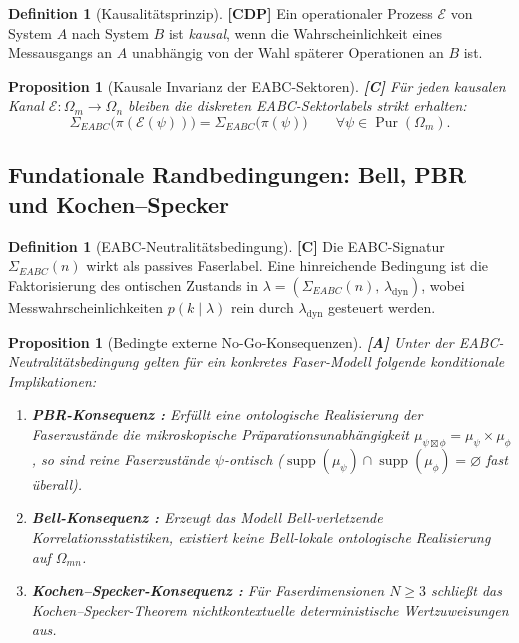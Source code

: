 \documentclass[11pt,a4paper,reqno]{amsart}
\newtheorem{proposition}[theorem]{Proposition}
\theoremstyle{definition}
\newtheorem{definition}[theorem]{Definition}
\theoremstyle{remark}
\newcommand{\Pur}{\operatorname{Pur}}
\begin{document}
	\begin{definition}[Kausalit\"atsprinzip] \cite{Chiribella2011} \textbf{[CDP]}
		Ein operationaler Prozess $\mathcal{E}$ von System $A$ nach System $B$ ist \emph{kausal}, wenn die Wahrscheinlichkeit eines Messausgangs an $A$ unabh\"angig von der Wahl sp\"aterer Operationen an $B$ ist.
	\end{definition}
	
	\begin{proposition}[Kausale Invarianz der EABC-Sektoren] \textbf{[C]}
		F\"ur jeden kausalen Kanal $\mathcal{E}: \Omega_m \to \Omega_n$ bleiben die diskreten EABC-Sektorlabels strikt erhalten:
		\begin{equation}
			\boxed{ \Sigma_{EABC}\bigl(\pi(\mathcal{E}(\psi))\bigr) = \Sigma_{EABC}\bigl(\pi(\psi)\bigr) \qquad \forall \psi \in \Pur(\Omega_m). }
		\end{equation}
	\end{proposition}
	
	\subsection{Fundationale Randbedingungen: Bell, PBR und Kochen--Specker}
	
	\begin{definition}[EABC-Neutralit\"atsbedingung] \textbf{[C]}
		Die EABC-Signatur $\Sigma_{EABC}(n)$ wirkt als passives Faserlabel. Eine hinreichende Bedingung ist die Faktorisierung des ontischen Zustands in $\lambda = (\Sigma_{EABC}(n), \, \lambda_{\mathrm{dyn}})$, wobei Messwahrscheinlichkeiten $p(k \mid \lambda)$ rein durch $\lambda_{\mathrm{dyn}}$ gesteuert werden.
	\end{definition}
	
	\begin{proposition}[Bedingte externe No-Go-Konsequenzen] \cite{Bell1964, PBR2012, KochenSpecker1967} \textbf{[A]}
		Unter der EABC-Neutralit\"atsbedingung gelten f\"ur ein konkretes Faser-Modell folgende konditionale Implikationen:
		\begin{enumerate}
			\item \textbf{PBR-Konsequenz \cite{PBR2012}:} Erf\"ullt eine ontologische Realisierung der Faserzust\"ande die mikroskopische Pr\"aparationsunabh\"angigkeit $\mu_{\psi \boxtimes \phi} = \mu_\psi \times \mu_\phi$, so sind reine Faserzust\"ande $\psi$-ontisch ($\operatorname{supp}(\mu_\psi) \cap \operatorname{supp}(\mu_\phi) = \varnothing$ fast \"uberall).
			\item \textbf{Bell-Konsequenz \cite{Bell1964}:} Erzeugt das Modell Bell-verletzende Korrelationsstatistiken, existiert keine Bell-lokale ontologische Realisierung auf $\Omega_{mn}$.
			\item \textbf{Kochen--Specker-Konsequenz \cite{KochenSpecker1967}:} F\"ur Faserdimensionen $N \ge 3$ schlie\ss{}t das Kochen--Specker-Theorem nichtkontextuelle deterministische Wertzuweisungen aus.
		\end{enumerate}
	\end{proposition}
	
\end{document}
